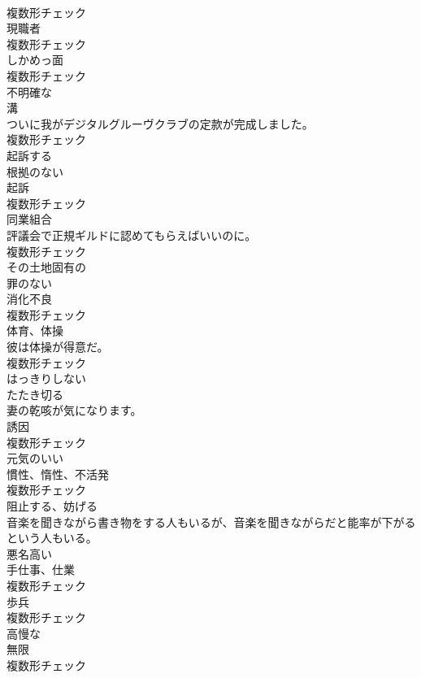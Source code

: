 \documentclass[8pt]{extreport}
\begin{document}
\begin{CJK}{UTF8}{min}
\\	複数形チェック
\\	[名詞]	現職者	
\\	複数形チェック
\\	[名詞]	しかめっ面	
\\	複数形チェック
\\	[形容詞]	不明確な	
\\	[名詞]	溝	
\\	ついに我がデジタルグルーヴクラブの定款が完成しました。	
\\	複数形チェック
\\	[動詞]	起訴する	
\\	[形容詞]	根拠のない	
\\	[名詞]	起訴	
\\	複数形チェック
\\	[名詞]	同業組合	
\\	評議会で正規ギルドに認めてもらえばいいのに。	
\\	複数形チェック
\\	[形容詞]	その土地固有の	
\\	[形容詞]	罪のない	
\\	[名詞]	消化不良	
\\	複数形チェック
\\	[名詞]	体育、体操	
\\	彼は体操が得意だ。	
\\	複数形チェック
\\	[形容詞]	はっきりしない	
\\	[動詞]	たたき切る	
\\	妻の乾咳が気になります。	
\\	[名詞]	誘因	
\\	複数形チェック
\\	[形容詞]	元気のいい	
\\	[名詞]	慣性、惰性、不活発	
\\	複数形チェック
\\	[動詞]	阻止する、妨げる	
\\	音楽を聞きながら書き物をする人もいるが、音楽を聞きながらだと能率が下がるという人もいる。	
\\	[形容詞]	悪名高い	
\\	[名詞]	手仕事、仕業	
\\	複数形チェック
\\	[名詞]	歩兵	
\\	複数形チェック
\\	[形容詞]	高慢な	
\\	[名詞]	無限	
\\	複数形チェック

\end{CJK}
\end{document}
